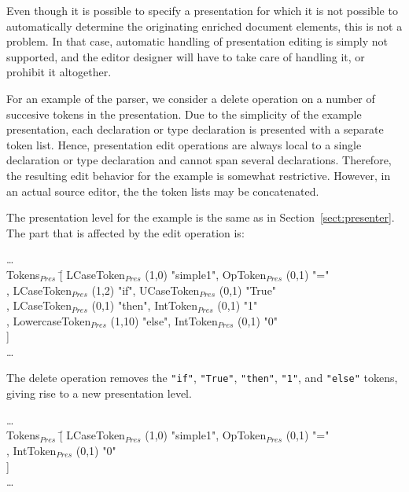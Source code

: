 Even though it is possible to specify a presentation for which it is not possible to automatically determine the originating enriched document elements, this is not a problem. In that case, automatic handling of presentation editing is simply not supported, and the editor designer will have to take care of handling it, or prohibit it altogether. 

For an example of the parser, we consider a delete operation on a number of succesive tokens in the presentation. Due to the simplicity of the example presentation, each declaration or type declaration is presented with a separate token list. Hence, presentation edit operations are always local to a single declaration or type declaration and cannot span several declarations. Therefore, the resulting edit behavior for the example is somewhat restrictive. However, in an actual source editor, the the token lists may be concatenated.

The presentation level for the example is the same as in Section~\ref{sect:presenter}. The part that is affected by the edit operation is: 

\small \ttfamily
\begin{tabbing}
\dots\\
Tokens$_{Pres}$ \= [ LCaseToken$_{Pres}$ (1,0) "simple1", OpToken$_{Pres}$ (0,1) "="\\
                         \> , LCaseToken$_{Pres}$ (1,2) "if", UCaseToken$_{Pres}$ (0,1) "True"\\
                         \> , LCaseToken$_{Pres}$ (0,1) "then", IntToken$_{Pres}$ (0,1) "1"\\
                         \> , LowercaseToken$_{Pres}$ (1,10) "else", IntToken$_{Pres}$ (0,1) "0"\\
                         \> ]\\
\dots                                                  
\end{tabbing}
\rmfamily \normalsize

The delete operation removes the \verb|"if"|,  \verb|"True"|,  \verb|"then"|,  \verb|"1"|, and  \verb|"else"| tokens, giving rise to a new presentation level.

\small \ttfamily
\begin{tabbing}
\dots\\
Tokens$_{Pres}$ \= [ LCaseToken$_{Pres}$ (1,0) "simple1", OpToken$_{Pres}$ (0,1) "="\\
                         \> ,  IntToken$_{Pres}$ (0,1) "0"\\
                         \> ]\\
\dots                                                  
\end{tabbing}
\rmfamily \normalsize

